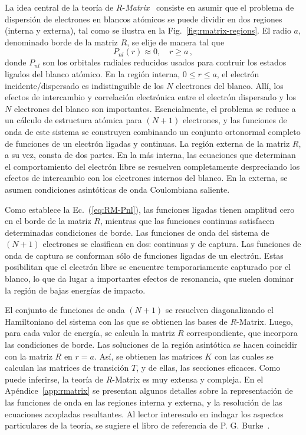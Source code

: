 La idea central de la teoría de $R$-\textit{Matrix}~\cite{Burke:11,
Burke:75,Griffin:07} consiste en asumir que el problema de dispersión de 
electrones en blancos atómicos se puede dividir en dos regiones (interna 
y externa), tal como se ilustra en la Fig.~\ref{fig:rmatrix-regions}. El 
radio $a$, denominado borde de la matriz $R$, se elije de manera tal que 
\begin{equation}
P_{nl}(r)\approx 0, \quad r\geq a\,,
\label{eq:RM-Pnl}
\end{equation}
donde $P_{nl}$ son los orbitales radiales reducidos usados para contruir 
los estados ligados del blanco atómico. En la región interna, 
$0\leq r\leq a$, el electrón incidente/dispersado es indistinguible de 
los $N$ electrones del blanco. Allí, los efectos de intercambio y 
correlación electrónica entre el electrón dispersado y los $N$ 
electrones del blanco son importantes. Esencialmente, el problema se 
reduce a un cálculo de estructura atómica para $(N+1)$ electrones, y las 
funciones de onda de este sistema se construyen combinando un conjunto 
ortonormal completo de funciones de un electrón ligadas y continuas. La 
región externa de la matriz $R$, a su vez, consta de dos partes. En la 
más interna, las ecuaciones que determinan el comportamiento del 
electrón libre se resuelven completamente despreciando los efectos 
de intercambio con los electrones internos del blanco. En la externa, se 
asumen condiciones asintóticas de onda Coulombiana saliente. 

Como establece la Ec.~(\ref{eq:RM-Pnl}), las funciones ligadas tienen 
amplitud cero en el borde de la matriz $R$, mientras que las funciones 
continuas satisfacen determinadas condiciones de borde. Las funciones de 
onda del sistema de $(N+1)$ electrones se clasifican en dos: continuas y 
de captura. Las funciones de onda de captura se conforman sólo de 
funciones ligadas de un electrón. Estas posibilitan que el electrón 
libre se encuentre temporariamente capturado por el blanco, lo 
que da lugar a importantes efectos de resonancia, que suelen dominar la 
región de bajas energías de impacto. 

El conjunto de funciones de onda $(N+1)$ se resuelven diagonalizando el
Hamiltoniano del sistema con las que se obtienen las bases de 
$R$-Matrix. Luego, para cada valor de energía, se calcula la matriz $R$ 
correspondiente, que incorpora las condiciones de borde. Las soluciones 
de la región asintótica se hacen coincidir con la matriz $R$ en $r=a$. 
Así, se obtienen las matrices $K$ con las cuales se calculan las 
matrices de transición $T$, y de ellas, las secciones eficaces. 
Como puede inferirse, la teoría de $R$-Matrix es muy extensa y compleja.
En el Apéndice~\ref{app:rmatrix} se presentan algunos detalles sobre la 
representación de las funciones de onda en las regiones interna y 
externa, y la resolución de las ecuaciones acopladas resultantes. 
Al lector interesado en indagar los aspectos particulares de la teoría,
se sugiere el libro de referencia de P. G. Burke~\cite{Burke:11}.

